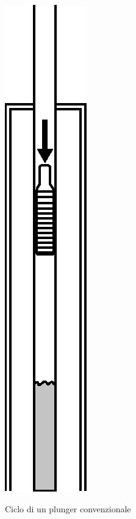 \begin{figure}[htbp]
    {\centering \includegraphics[height=.3\textheight]{fig/foamer/plunger-conventional/conventionalplunger-E.eps} \label{fig:plunger-conventional-E} }
    \caption{Ciclo di un plunger convenzionale}
    \label{fig:conventionalplunger}
\end{figure}

